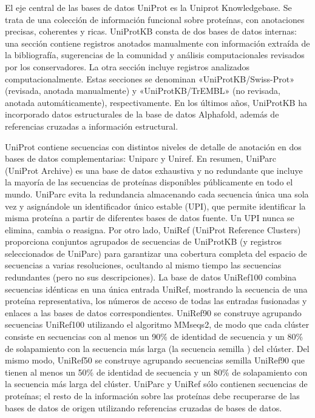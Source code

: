 El eje central de las bases de datos UniProt es la Uniprot Knowledgebase. Se trata de una colección de información funcional sobre proteínas, con anotaciones precisas, coherentes y ricas. UniProtKB consta de dos bases de datos internas: una sección contiene registros anotados manualmente con información extraída de la bibliografía, sugerencias de la comunidad y análisis computacionales revisados por los conservadores. La otra sección incluye registros analizados computacionalmente. Estas secciones se denominan «UniProtKB/Swiss-Prot» (revisada, anotada manualmente) y «UniProtKB/TrEMBL» (no revisada, anotada automáticamente), respectivamente.
En los últimos años, UniProtKB ha incorporado datos estructurales de la base de datos Alphafold, además de referencias cruzadas a información estructural. 

UniProt contiene secuencias con distintos niveles de detalle de anotación en dos bases de datos complementarias: Uniparc y Uniref. En resumen, UniParc (UniProt Archive) es una base de datos exhaustiva y no redundante que incluye la mayoría de las secuencias de proteínas disponibles públicamente en todo el mundo. UniParc evita la redundancia almacenando cada secuencia única una sola vez y asignándole un identificador único estable (UPI), que permite identificar la misma proteína a partir de diferentes bases de datos fuente. Un UPI nunca se elimina, cambia o reasigna. Por otro lado, UniRef (UniProt Reference Clusters) proporciona conjuntos agrupados de secuencias de UniProtKB (y registros seleccionados de UniParc) para garantizar una cobertura completa del espacio de secuencias a varias resoluciones, ocultando al mismo tiempo las secuencias redundantes (pero no sus descripciones). 
La base de datos UniRef100 combina secuencias idénticas en una única entrada UniRef, mostrando la secuencia de una proteína representativa, los números de acceso de todas las entradas fusionadas y enlaces a las bases de datos correspondientes. UniRef90 se construye agrupando secuencias UniRef100 utilizando el algoritmo MMseqs2, de modo que cada clúster consiste en secuencias con al menos un 90\% de identidad de secuencia y un 80\% de solapamiento con la secuencia más larga (la secuencia semilla ) del clúster. Del mismo modo, UniRef50 se construye agrupando secuencias semilla UniRef90 que tienen al menos un 50\% de identidad de secuencia y un 80\% de solapamiento con la secuencia más larga del clúster. UniParc y UniRef sólo contienen secuencias de proteínas; el resto de la información sobre las proteínas debe recuperarse de las bases de datos de origen utilizando referencias cruzadas de bases de datos.

